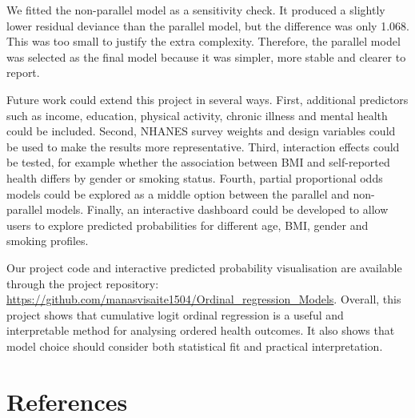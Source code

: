 \documentclass{article}
\begin{document}
We fitted the non-parallel model as a sensitivity check. It produced a
slightly lower residual deviance than the parallel model, but the
difference was only 1.068. This was too small to justify the extra
complexity. Therefore, the parallel model was selected as the final
model because it was simpler, more stable and clearer to report.

Future work could extend this project in several ways. First, additional
predictors such as income, education, physical activity, chronic illness
and mental health could be included. Second, NHANES survey weights and
design variables could be used to make the results more representative.
Third, interaction effects could be tested, for example whether the
association between BMI and self-reported health differs by gender or
smoking status. Fourth, partial proportional odds models could be
explored as a middle option between the parallel and non-parallel
models. Finally, an interactive dashboard could be developed to allow
users to explore predicted probabilities for different age, BMI, gender
and smoking profiles.

Our project code and interactive predicted probability visualisation are
available through the project repository:
\url{https://github.com/manasvisaite1504/Ordinal_regression_Models}.
Overall, this project shows that cumulative logit ordinal regression is
a useful and interpretable method for analysing ordered health outcomes.
It also shows that model choice should consider both statistical fit and
practical interpretation.

\section*{References}\label{references}
\end{document}
